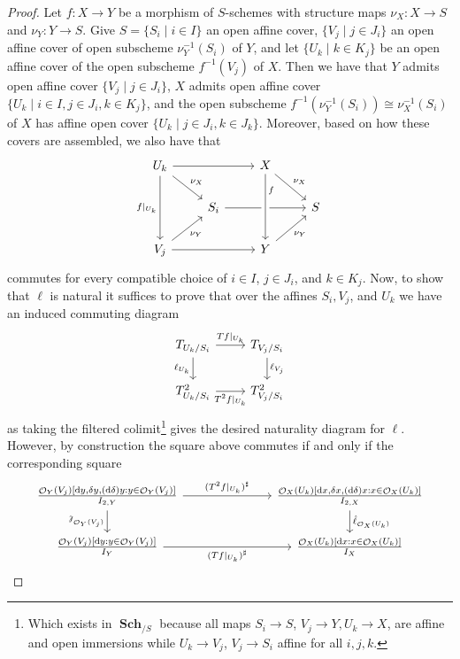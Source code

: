 \documentclass{amsart}
\theoremstyle{definition}
\DeclareMathOperator{\Ocal}{\mathcal{O}}
\DeclareMathOperator{\Sch}{\mathbf{Sch}}
\numberwithin{equation}{subsection}
\begin{document}
\begin{proof}
Let $f:X \to Y$ be a morphism of $S$-schemes with structure maps $\nu_X:X \to S$ and $\nu_Y:Y \to S$. Give $S = \lbrace S_i \; | \; i \in I \rbrace$ an open affine cover, $\lbrace V_j \; | \; j \in J_i \rbrace$ an open affine cover of open subscheme $\nu_Y^{-1}(S_i)$ of $Y$, and let $\lbrace U_k \; | \; k \in K_j \rbrace$ be an open affine cover of the open subscheme $f^{-1}(V_j)$ of $X$. Then we have that $Y$ admits open affine cover $\lbrace V_j \; | \; j \in J_i \rbrace$, $X$ admits open affine cover $\lbrace U_k \; | \; i \in I, j \in J_i, k \in K_j \rbrace$, and the open subscheme $f^{-1}(\nu_Y^{-1}(S_i)) \cong \nu_X^{-1}(S_i)$ of $X$ has affine open cover $\lbrace U_k \; | \; j \in J_i, k \in J_k \rbrace$. Moreover, based on how these covers are assembled, we also have that
\[
\begin{tikzcd}
U_k \ar[dr]{}{\nu_X} \ar[rr] \ar[dd, swap]{}{f|_{U_k}} & & X  \ar[dr]{}{\nu_X} \\
 & S_i \ar[rr] & & S \\
V_j \ar[rr] \ar[ur, swap]{}{\nu_Y} & & Y \ar[ur, swap]{}{\nu_Y}
\ar[from = 1-3, to = 3-3, crossing over, near start]{}{f}
\end{tikzcd}
\]
commutes for every compatible choice of $i \in I$, $j \in J_i$, and $k \in K_j$. Now, to show that $\ell$ is natural it suffices to prove that over the affines $S_i, V_j$, and $U_k$ we have an induced commuting diagram
\[
\begin{tikzcd}
T_{U_k/S_i} \ar[r]{}{Tf|_{U_k}} \ar[d, swap]{}{\ell_{U_k}} & T_{V_j/S_i} \ar[d]{}{\ell_{V_j}} \\
T^2_{U_k/S_i} \ar[r, swap]{}{T^2f|_{U_k}} & T^2_{V_j/S_i}
\end{tikzcd}
\]
as taking the filtered colimit\footnote{Which exists in $\Sch_{/S}$ because all maps $S_i \to S$, $V_j \to Y, U_k \to X$, are affine and open immersions while $U_k \to V_j$, $V_j \to S_i$ affine for all $i, j ,k$.} gives the desired naturality diagram for $\ell$. However, by construction the square above commutes if and only if the corresponding square
\[
\begin{tikzcd}
\frac{\Ocal_Y(V_j)[\mathrm{d}y, \delta y, (\mathrm{d}\delta)y:y \in \Ocal_Y(V_j)]}{I_{2,Y}} \ar[d, swap]{}{\rotatebox[origin = c]{180}{$\ell$}_{\Ocal_Y(V_j)}} \ar[rrr]{}{(T^2f|_{U_k})^{\sharp}} & & & \frac{\Ocal_X(U_k)[\mathrm{d}x, \delta x, (\mathrm{d}\delta)x:x \in \Ocal_X(U_k)]}{I_{2,X}}\ar[d]{}{\hat{\ell}_{\Ocal_X(U_k)}} \\
\frac{\Ocal_Y(V_j)[\mathrm{d}y:y \in \Ocal_Y(V_j)]}{I_Y} \ar[rrr, swap]{}{(Tf|_{U_k})^{\sharp}} & & & \frac{\Ocal_X(U_k)[\mathrm{d}x:x \in \Ocal_X(U_k)]}{I_{X}}

\end{tikzcd}\]
\end{proof}
\end{document}
